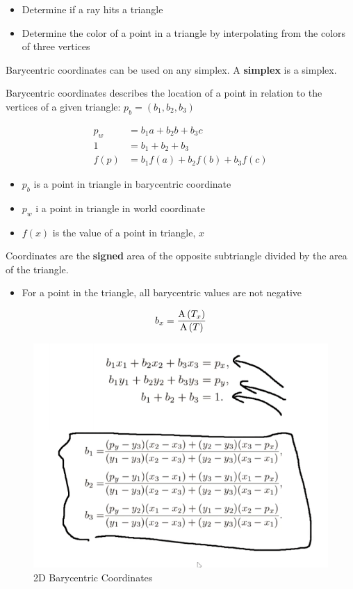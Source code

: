     \begin{itemize}
      \item Determine if a ray hits a triangle
      \item Determine the color of a point in a triangle by interpolating from
      the colors of three vertices
    \end{itemize}

    Barycentric coordinates can be used on any \gls{simplex}.
    A \textbf{\gls{simplex}} is a \glsdesc{simplex}.

    Barycentric coordinates describes the location of a point in relation to
    the vertices of a given triangle:
    $ p_{b} = \left( b_{1}, b_{2}, b_{3} \right) $

    \begin{align}
      p_{w} &= b_{1} a + b_{2} b + b_{3} c \\
      1 &= b_{1} + b_{2} + b_{3} \\
      f\left( p \right) &=
        b_{1} f\left( a \right)
        + b_{2} f\left( b \right)
        + b_{3} f\left( c \right)
    \end{align}

    \begin{itemize}
      \item $ p_{b} $ is a point in triangle in barycentric coordinate
      \item $ p_{w} $ i a point in triangle in world coordinate
      \item $ f\left( x \right) $ is the value of a point in triangle, $ x $
    \end{itemize}

    Coordinates are the \textbf{signed} area of the opposite subtriangle
    divided by the area of the triangle.

    \begin{itemize}
      \item For a point in the triangle, all barycentric values are not negative
    \end{itemize}

    \begin{align}
      b_{x} = \frac{\operatorname{A}\left( T_{x} \right)}{\operatorname{A}\left( T \right)}
    \end{align}

    \begin{figure}[H]
      \centering
      \caption{2D Barycentric Coordinates}
      \includegraphics[width=0.7\columnwidth]{images/intersection/2d-barycentric.png}
    \end{figure}

